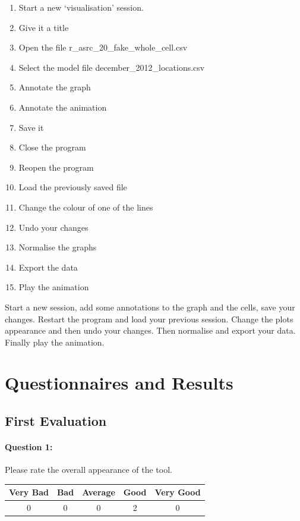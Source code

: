 \begin{enumerate}
\item Start a new `visualisation' session.
\item Give it a title
\item Open the file r\_asrc\_20\_fake\_whole\_cell.csv
\item Select the model file december\_2012\_locations.csv
\item Annotate the graph
\item Annotate the animation
\item Save it
\item Close the program
\item Reopen the program
\item Load the previously saved file
\item Change the colour of one of the lines
\item Undo your changes
\item Normalise the graphs
\item Export the data
\item Play the animation
\end{enumerate}

Start a new session, add some annotations to the graph and the cells, save your changes.  Restart the program and load your previous session.  Change the plots appearance and then undo your changes.  Then normalise and export your data.  Finally play the animation.

\clearpage

\section{Questionnaires and Results}
\label{sec:qs}


\subsection{First Evaluation}

\paragraph*{Question 1: } Please rate the overall appearance of the tool.

\begin{center}
\begin{tabular}{ | c | c | c | c | c |}
    \hline
    Very Bad & Bad & Average & Good & Very Good \\
    \hline
    0 & 0 & 0 & 2 & 0 \\
    \hline
\end{tabular}
\end{center}

